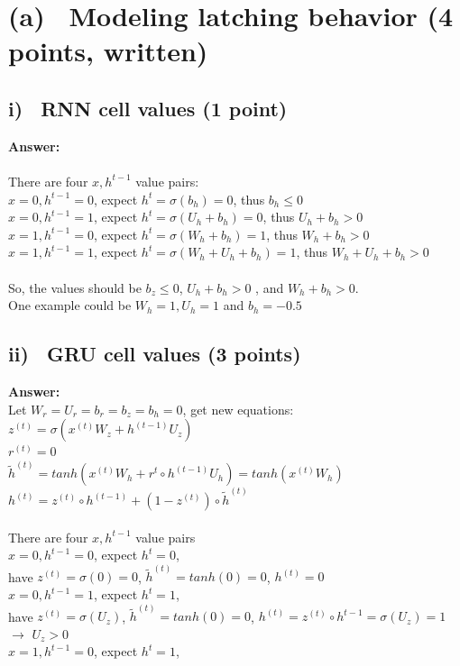\documentclass[fleqn]{MJD}
\newcommand{\subproblem}[2]{\section{(#1)~ #2}}
\newcommand{\subsubproblem}[2]{\subsection{ #1)~ #2}}
\newcommand{\0}{\emptyset}
\begin{document}
\subproblem{a}{ Modeling latching behavior (4 points, written)}
\subsubproblem{i} {RNN cell values (1 point)}
\noindent \textbf{Answer:} \\ \\
\indent There are four $x,h^{t-1}$ value pairs: \\
\indent \indent $x=0, h^{t-1}=0$, expect $h^{t}=\sigma(b_{h})=0$, thus $b_{h} \le 0$ \\
\indent \indent $x=0, h^{t-1}=1$, expect $h^{t}=\sigma(U_{h} + b_{h})=0$, thus $U_{h} + b_{h}>0$ \\
\indent \indent $x=1, h^{t-1}=0$, expect $h^{t}=\sigma(W_{h} + b_{h})=1$, thus $W_{h} + b_{h}>0$ \\
\indent \indent $x=1, h^{t-1}=1$, expect $h^{t}=\sigma(W_{h} + U_{h} + b_{h})=1$, thus $W_{h} + U_{h} + b_{h}>0$ \\ \\
\indent So, the values should be $b_{z} \le 0$, $U_{h} + b_{h}>0$ , and  $W_{h} + b_{h}>0$.  \\
\indent One example could be $W_{h} = 1, U_{h} = 1$ and $b_{h} = -0.5$
\subsubproblem{ii} {GRU cell values (3 points)}
\noindent \textbf{Answer:} \\
\indent Let $W_{r} = U_{r} = b_{r} = b_{z} = b_{h} = 0$, get new equations: \\
\indent \indent $z^{(t)}=\sigma(x^{(t)}W_{z} + h^{(t-1)}U_{z})$\\
\indent \indent $r^{(t)}=0$\\
\indent \indent $\tilde{h}^{(t)}=tanh(x^{(t)}W_{h} + r^{t} \circ h^{(t-1)}U_{h})=tanh(x^{(t)}W_{h})$\\
\indent \indent $h^{(t)}=z^{(t)} \circ  h^{(t-1)} + (1 - z^{(t)}) \circ \tilde{h}^{(t)} $ \\ \\
\indent There are four $x,h^{t-1}$ value pairs \\
\indent \indent $x=0, h^{t-1}=0$, expect $h^{t}=0$, \\
\indent \indent \indent have $z^{(t)}=\sigma(0)=0$, $\tilde{h}^{(t)}=tanh(0)=0$, $h^{(t)}=0$ \\
\indent \indent $x=0, h^{t-1}=1$, expect $h^{t}=1$, \\ 
\indent \indent \indent have  $z^{(t)}=\sigma(U_{z})$, $\tilde{h}^{(t)}=tanh(0)=0$, $h^{(t)}=z^{(t)} \circ h^{t-1} = \sigma(U_{z}) = 1$ \\
\indent \indent \indent $\to$ $U_{z} > 0$ \\
\indent \indent $x=1, h^{t-1}=0$, expect $h^{t}=1$, \\
\end{document}
